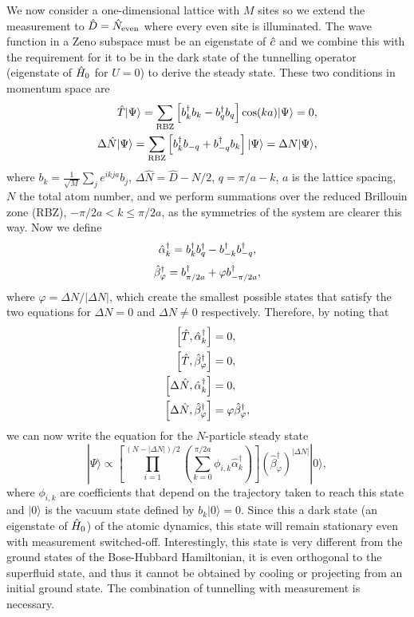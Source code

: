 We now consider a one-dimensional lattice with $M$ sites so we extend
the measurement to $\hat{D} = \hat{N}_\text{even}$ where every even site is
illuminated.  The wave function in a Zeno subspace must be an
eigenstate of $\hat{c}$ and we combine this with the requirement for it to
be in the dark state of the tunnelling operator (eigenstate of $\hat{H}_0$
for $U = 0$) to derive the steady state. These two conditions in
momentum space are
\begin{align}
  \hat{T} | \Psi \rangle = \sum_{\text{RBZ}} \left[ b^\dagger_k b_k -
    b^\dagger_{q} b_{q} \right] \cos(ka) |\Psi \rangle = 0, \\
  \Delta \hat{N} |\Psi \rangle = \sum_{\text{RBZ}} \left[ b^\dagger_k b_{-q} +
    b^\dagger_{-q} b_k \right] | \Psi \rangle= \Delta N |\Psi \rangle,
\end{align}
where $b_k = \frac{1}{\sqrt{M}} \sum_j e^{i k j a} b_j$,
$\Delta \hat{N} = \hat{D} - N/2$, $q = \pi/a - k$, $a$ is the lattice
spacing, $N$ the total atom number, and we perform summations over the
reduced Brillouin zone (RBZ), $-\pi/2a < k \le \pi/2a$, as the
symmetries of the system are clearer this way. Now we define
\begin{equation}
\hat{\alpha}_k^\dagger = b^\dagger_k b^\dagger_q - b^\dagger_{-k} b^\dagger_{-q},
\end{equation}
\begin{equation}
\hat{\beta}_\varphi^\dagger = b^\dagger_{\pi/2a} + \varphi b^\dagger_{-\pi/2a},
\end{equation}
where $\varphi = \Delta N / | \Delta N |$, which create the smallest
possible states that satisfy the two equations for $\Delta N = 0$ and
$\Delta N \ne 0$ respectively. Therefore, by noting that
\begin{align}
  \left[ \hat{T}, \hat{\alpha}_k^\dagger \right] & = 0, \\
  \left[ \hat{T}, \hat{\beta}_\varphi^\dagger \right] & = 0, \\
  \left[ \Delta \hat{N}, \hat{\alpha}_k^\dagger \right] & = 0, \\
  \left[ \Delta \hat{N}, \hat{\beta}_\varphi^\dagger \right] & = \varphi
  \hat{\beta}_\varphi^\dagger,
\end{align}
we can now write the equation for the $N$-particle steady state
\begin{equation}
  \label{eq:ss}
  | \Psi \rangle \propto \left[ \prod_{i=1}^{(N - |\Delta N|)/2}
    \left( \sum_{k = 0}^{\pi/2a} \phi_{i,k} \hat{\alpha}_k^\dagger
    \right) \right] \left( \hat{\beta}_\varphi^\dagger \right)^{|
    \Delta N |} | 0 \rangle,
\end{equation}
where $\phi_{i,k}$ are coefficients that depend on the trajectory
taken to reach this state and $|0 \rangle$ is the vacuum state defined
by $b_k |0 \rangle = 0$. Since this a dark state (an eigenstate of
$\hat{H}_0$) of the atomic dynamics, this state will remain stationary even
with measurement switched-off. Interestingly, this state is very
different from the ground states of the Bose-Hubbard Hamiltonian, it
is even orthogonal to the superfluid state, and thus it cannot be
obtained by cooling or projecting from an initial ground state. The
combination of tunnelling with measurement is necessary.

